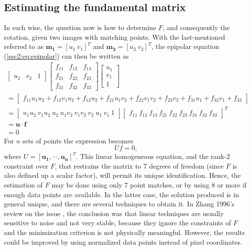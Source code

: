 \subsection{Estimating the fundamental matrix}
\label{einvonrev}
In such wise, the question now is how to determine $F$, and consequently the rotation, given two images with matching points. With the last-mentioned referred to as $\mathbf{m_{1}} = [u_{1} \ v_{1}]^T$ and $\mathbf{m_{2}} = [u_{2}  \ v_{2}]^T$, the epipolar equation (\ref{sec2:eq:epipolar}) can then be written as
\begin{equation}
\begin{aligned}
\begin{bmatrix}
u_2 & v_2 & 1
\end{bmatrix}
\begin{bmatrix}
f_{11} & f_{12} & f_{13}  \\
f_{21} & f_{22} & f_{23}  \\
f_{31} & f_{32} & f_{33} 
\end{bmatrix}
\begin{bmatrix}
u_{1} \\ v_{1} \\ 1
\end{bmatrix}\\
=
\begin{bmatrix}
f_{11} u_1 u_2 + f_{12} v_1 u_2  + f_{13}u_2 + f_{21} u_1 v_2  + f_{22} v_1 v_2  + f_{23}v_2  + f_{31} u_1 + f_{32} v_1 + f_{33} 
\end{bmatrix}\\
=
\begin{bmatrix}
u_1u_2 \ v_1u_2 \ u_2 \ u_1v_2 \ v_1v_2 \  v_2 \ u_1 \ v_1 \ 1 
\end{bmatrix}
\begin{bmatrix}
f_{11} \ f_{12} \ f_{13} \ f_{21} \ f_{22} \ f_{23} \ f_{31} \ f_{32} \ f_{33}
\end{bmatrix}^T\\
= \mathbf{u} \cdot \mathbf{f}\\ = 0
\end{aligned}
\end{equation}
For $n$ sets of points the expression becomes 
\begin{equation}
\label{sec2:eq:nsets}
U f = 0,
\end{equation}
where $U = \left[ \mathbf{u_ { 1 }} , \cdots , \mathbf{u_ { n }} \right] ^ { T }$. 
This linear homogeneous equation, and the rank-2 constraint over $F$, that restrains the matrix to 7 degrees of freedom (since $F$ is also defined up a scalar factor), will permit its unique identification. 
Hence, the estimation of $F$ may be done using only 7 point matches, or by using 8 or more if enough data points are available. In the latter case, the solution produced is in general unique, and there are several techniques to obtain it. In Zhang 1996's review on the issue \cite{detep}, the conclusion was that linear techniques are usually sensitive to noise and not very stable, because they ignore the constraints of $F$ and the minimization criterion is not physically meaningful. However, the results could be improved by using normalized data points instead of pixel coordinates. 

